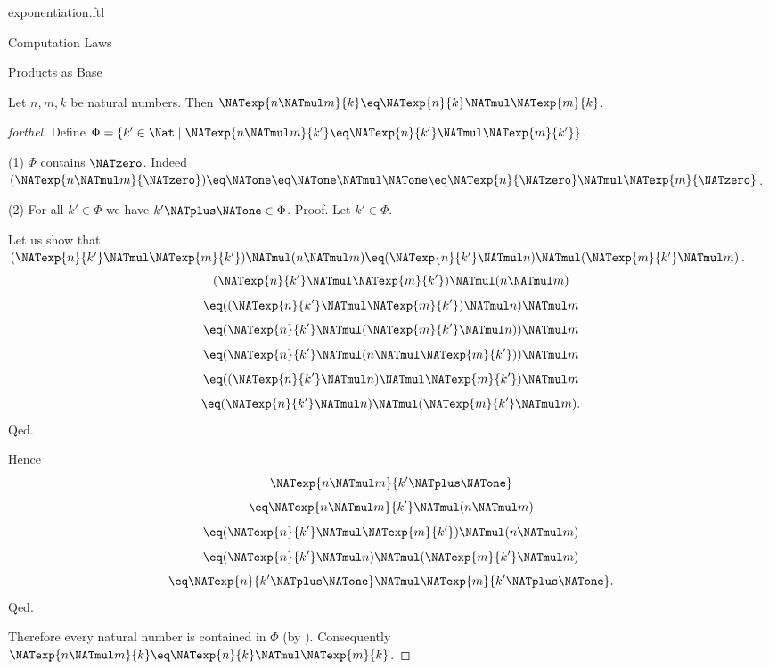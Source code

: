 \documentclass{naproche-library}
\begin{document}
\begin{smodule}[title=Exponentiation]{exponentiation.ftl}
\begin{sfragment}{Computation Laws}
  \begin{sfragment}{Products as Base}
    \begin{proposition}[forthel,id=ARITHMETIC_09_2563032276271104]
      Let $n, m, k$ be natural numbers.
      Then $\NATexp{n \NATmul m}{k} \eq \NATexp{n}{k} \NATmul \NATexp{m}{k}$.
    \end{proposition}
    \begin{proof}[forthel]
      Define $\Phi = \{ k' \in \Nat \mid \NATexp{n \NATmul m}{k'} \eq \NATexp{n}{k'} \NATmul \NATexp{m}{k'} \}$.

      (1) $\Phi$ contains $\NATzero$.
      Indeed $(\NATexp{n \NATmul m}{\NATzero})
        \eq \NATone
        \eq \NATone \NATmul \NATone
        \eq \NATexp{n}{\NATzero} \NATmul \NATexp{m}{\NATzero}$. %

      (2) For all $k' \in \Phi$ we have $k' \NATplus \NATone \in \Phi$. \newline
      Proof.
        Let $k' \in \Phi$.

        Let us show that $(\NATexp{n}{k'} \NATmul \NATexp{m}{k'}) \NATmul (n \NATmul m) \eq (\NATexp{n}{k'} \NATmul n) \NATmul (\NATexp{m}{k'} \NATmul m)$.
          \[  (\NATexp{n}{k'} \NATmul \NATexp{m}{k'}) \NATmul (n \NATmul m)       \]
          \[    \eq ((\NATexp{n}{k'} \NATmul \NATexp{m}{k'}) \NATmul n) \NATmul m   \]
          \[    \eq (\NATexp{n}{k'} \NATmul (\NATexp{m}{k'} \NATmul n)) \NATmul m   \]
          \[    \eq (\NATexp{n}{k'} \NATmul (n \NATmul \NATexp{m}{k'})) \NATmul m   \]
          \[    \eq ((\NATexp{n}{k'} \NATmul n) \NATmul \NATexp{m}{k'}) \NATmul m   \]
          \[    \eq (\NATexp{n}{k'} \NATmul n) \NATmul (\NATexp{m}{k'} \NATmul m).  \]
        Qed.

        Hence
        \[  \NATexp{n \NATmul m}{k' \NATplus \NATone}                          \]
        \[    \eq \NATexp{n \NATmul m}{k'} \NATmul (n \NATmul m)        \]
        \[    \eq (\NATexp{n}{k'} \NATmul \NATexp{m}{k'}) \NATmul (n \NATmul m)   \]
        \[    \eq (\NATexp{n}{k'} \NATmul n) \NATmul (\NATexp{m}{k'} \NATmul m)   \]
        \[    \eq \NATexp{n}{k' \NATplus \NATone} \NATmul \NATexp{m}{k' \NATplus \NATone}.              \]
      Qed.

      Therefore every natural number is contained in $\Phi$ (by ).
      Consequently $\NATexp{n \NATmul m}{k} \eq \NATexp{n}{k} \NATmul \NATexp{m}{k}$.
    \end{proof}
  \end{sfragment}


\end{sfragment}
\end{smodule}
\end{document}
